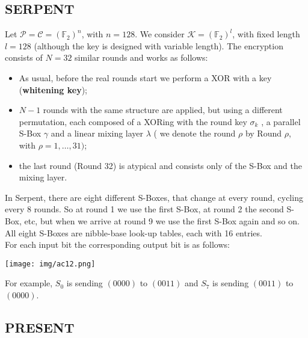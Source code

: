 \documentclass[a4paper, 10pt, titlepage]{article}
\begin{document}
\subsection{SERPENT}
Let $\mathcal{P} = \mathcal{C} = (\mathbb{F}_2)^n$, with $n = 128$. We consider $\mathcal{K} = (\mathbb{F}_2 )^l$, with fixed length $l = 128$ (although the key is designed with variable length).
The encryption consists of $N = 32$ similar rounds and works as follows:
\begin{itemize}
\item As usual, before the real rounds start we perform a XOR with a key (\textbf{whitening key});
\item $N - 1$ rounds with the same structure are applied, but using a
different permutation, each composed of a XORing with the round key $\sigma_k$ , a parallel S-Box $\gamma$ and a linear mixing layer $\lambda$ ( we denote the round $\rho$ by Round $\rho$, with $\rho = 1, \dots, 31)$;
\item the last round (Round 32) is atypical and consists only of the S-Box and the mixing layer.
\end{itemize}
In Serpent, there are eight different S-Boxes, that change at every round, cycling every 8 rounds. So at round 1 we use the first S-Box, at round 2 the second S-Box, etc, but when we arrive at round 9 we use the first S-Box again and so on. All eight S-Boxes are nibble-base look-up tables, each with 16 entries. \\
For each input bit the corresponding output bit is as follows:
\begin{center}
\texttt{[image: img/ac12.png]}
\end{center}
For example, $S_0$ is sending $(0000)$ to $(0011)$ and $S_7$ is sending $(0011)$ to $(0000)$.

\subsection{PRESENT}
\end{document}
